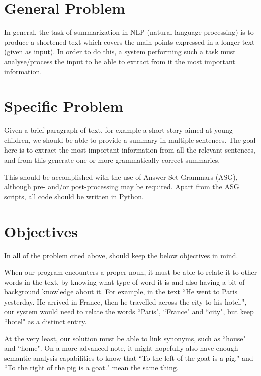 \label{chapter:introduction}

\section{General Problem}

In general, the task of summarization in NLP (natural language processing) is to produce a shortened text which covers the main points expressed in a longer text (given as input). In order to do this, a system performing such a task must analyse/process the input to be able to extract from it the most important information.

\section{Specific Problem}

Given a brief paragraph of text, for example a short story aimed at young children, we should be able to provide a summary in multiple sentences. The goal here is to extract the most important information from all the relevant sentences, and from this generate one or more grammatically-correct summaries.

This should be accomplished with the use of Answer Set Grammars (ASG), although pre- and/or post-processing may be required. Apart from the ASG scripts, all code should be written in Python.

\section{Objectives}

In all of the problem cited above, should keep the below objectives in mind.

\begin{objective}
When our program encounters a proper noun, it must be able to relate it to other words in the text, by knowing what type of word it is and also having a bit of background knowledge about it. For example, in the text ``He went to Paris yesterday. He arrived in France, then he travelled across the city to his hotel.", our system would need to relate the words ``Paris", ``France" and ``city", but keep ``hotel" as a distinct entity.
\end{objective}

\begin{objective}[Periphrasis]
At the very least, our solution must be able to link synonyms, such as ``house" and ``home". On a more advanced note, it might hopefully also have enough semantic analysis capabilities to know that ``To the left of the goat is a pig." and ``To the right of the pig is a goat." mean the same thing.
\end{objective}

